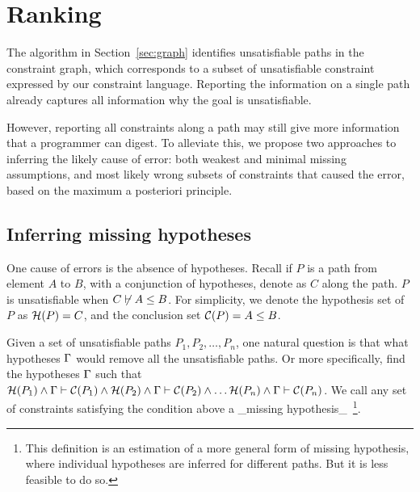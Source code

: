 % 
% 
% 
% 
% 
% 
\section{Ranking}
\label{sec:ranking}

The algorithm in Section~\ref{sec:graph} identifies unsatisfiable paths in the
constraint graph, which corresponds to a subset of unsatisfiable constraint
expressed by our constraint language. Reporting the information on a single
path already captures all information why the goal is unsatisfiable.

However, reporting all constraints along a path may still give more
information that a programmer can digest. To alleviate this, we
propose two approaches to inferring the likely cause of error: both
weakest and minimal missing assumptions, and most likely wrong subsets
of constraints that caused the error, based on the maximum a posteriori
principle.
 
\subsection{Inferring missing hypotheses}
\label{sec:assumptions}

One cause of errors is the absence of hypotheses.
Recall if $P$ is a path from element $A$ to $B$, with a conjunction
of hypotheses, denote as $C$ along the path. $P$ is unsatisfiable when
$C\not\vdash A\leq B$. For simplicity, we denote the hypothesis set
of $P$ as $\mathcal{H}(P)=C$, and the conclusion set
$\mathcal{C}(P)=A\leq B$.

Given a set of unsatisfiable paths $P_1, P_2, \dots,  P_n$, one natural
question is that what hypotheses $\Gamma$ would remove all the unsatisfiable
paths. Or more specifically, find the hypotheses $\Gamma$ such that 
%
$\mathcal{H}(P_1) \land \Gamma \vdash \mathcal{C}(P_1) \land
\mathcal{H}(P_2) \land \Gamma \vdash \mathcal{C}(P_2) \land \dots
\mathcal{H}(P_n) \land \Gamma \vdash \mathcal{C}(P_n)$.
%
We call any set of constraints satisfying the condition above a
_missing hypothesis_~\footnote{This definition is an estimation of a
more general form of missing hypothesis, where individual hypotheses
are inferred for different paths. But it is less feasible to do so.}.

